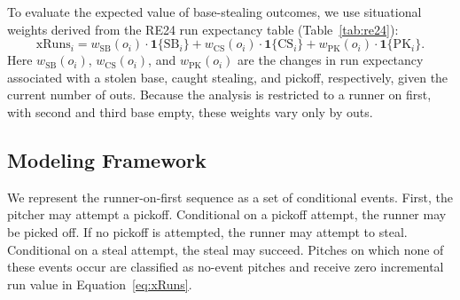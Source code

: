 \documentclass[12pt,letterpaper]{article}
\begin{document}
To evaluate the expected value of base-stealing outcomes, we use situational weights derived from the RE24 run expectancy table (Table~\ref{tab:re24}):
\begin{equation}
    \mathrm{xRuns}_i = w_{\mathrm{SB}}(o_i) \cdot \mathbf{1}\{\mathrm{SB}_i\}
    + w_{\mathrm{CS}}(o_i) \cdot \mathbf{1}\{\mathrm{CS}_i\}
    + w_{\mathrm{PK}}(o_i) \cdot \mathbf{1}\{\mathrm{PK}_i\}. \label{eq:xRuns}
\end{equation}
Here $w_{\mathrm{SB}}(o_i)$, $w_{\mathrm{CS}}(o_i)$, and $w_{\mathrm{PK}}(o_i)$ are the changes in run expectancy associated with a stolen base, caught stealing, and pickoff, respectively, given the current number of outs. Because the analysis is restricted to a runner on first, with second and third base empty, these weights vary only by outs.

\subsection{Modeling Framework}

We represent the runner-on-first sequence as a set of conditional events. First, the pitcher may attempt a pickoff. Conditional on a pickoff attempt, the runner may be picked off. If no pickoff is attempted, the runner may attempt to steal. Conditional on a steal attempt, the steal may succeed. Pitches on which none of these events occur are classified as no-event pitches and receive zero incremental run value in Equation~\ref{eq:xRuns}.
\end{document}

